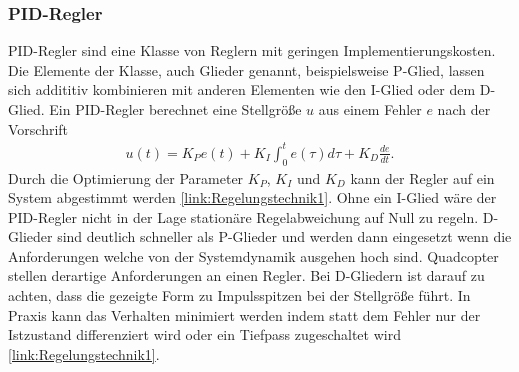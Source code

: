\subsubsection{\label{pid:pid}PID-Regler}
PID-Regler sind eine Klasse von Reglern mit geringen Implementierungskosten.
Die Elemente der Klasse, auch Glieder genannt, beispielsweise P-Glied, lassen sich addititiv kombinieren mit anderen Elementen wie den I-Glied oder dem D-Glied.
Ein PID-Regler berechnet eine Stellgröße $u$ aus einem Fehler $e$ nach der Vorschrift
\label{pidregler}
\begin{align}
	u(t) = K_Pe(t) + K_I\int_0^t e(\tau)d\tau + K_D\frac{de}{dt}.
\end{align}
Durch die Optimierung der Parameter $K_P$, $K_I$ und $K_D$ kann der Regler auf ein System abgestimmt werden \ref{link:Regelungstechnik1}. Ohne ein I-Glied wäre der PID-Regler nicht in der Lage stationäre Regelabweichung auf Null zu regeln. D-Glieder sind deutlich schneller als P-Glieder und werden dann eingesetzt wenn die Anforderungen welche von der Systemdynamik ausgehen hoch sind. Quadcopter stellen derartige Anforderungen an einen Regler. Bei D-Gliedern ist darauf zu achten, dass die gezeigte Form zu Impulsspitzen bei der Stellgröße führt. In Praxis kann das Verhalten minimiert werden indem statt dem Fehler nur der Istzustand differenziert wird oder ein Tiefpass zugeschaltet wird \ref{link:Regelungstechnik1}. 

